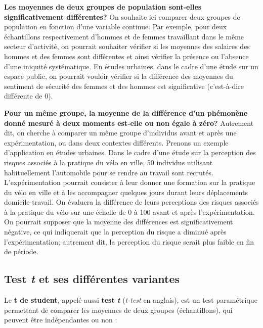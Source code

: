 \documentclass[
  11pt,
  french,
]{book}
\makeatletter
\newenvironment{kframev}{%
\medskip{}
\setlength{\fboxsep}{.8em}
 \def\at@end@of@kframev{}%
 \ifinner\ifhmode%
  \def\at@end@of@kframev{\end{minipage}}%
  \begin{minipage}{\columnwidth}%
 \fi\fi%
 \def\FrameCommand##1{\hskip\@totalleftmargin \hskip-\fboxsep
 \colorbox{shadebluecolor}{##1}\hskip-\fboxsep
     \hskip-\linewidth \hskip-\@totalleftmargin \hskip\columnwidth}%
 \MakeFramed {\advance\hsize-\width
   \@totalleftmargin\z@ \linewidth\hsize
   \@setminipage}}%
 {\par\unskip\endMakeFramed%
 \at@end@of@kframev}
\newenvironment{rmdblock}[1]
  {
  \begin{itemize}
  \renewcommand{\labelitemi}{
    \raisebox{-.7\height}[0pt][0pt]{
      {\setkeys{Gin}{width=3em,keepaspectratio}\texttt{[image: images/\#1]}}
    }
  }
  \setlength{\fboxsep}{1em}
  \begin{kframev}
  \small
  \item
  }
  {
  \end{kframev}
  \end{itemize}
  }
\newenvironment{bloc_objectif}
  {\begin{rmdblock}{objectif}}
  {\end{rmdblock}}
\makeatother
\begin{document}
\begin{bloc_objectif}

\textbf{Les moyennes de deux groupes de population sont-elles significativement différentes?} On souhaite ici comparer deux groupes de population en fonction d'une variable continue.
Par exemple, pour deux échantillons respectivement d'hommes et de femmes travaillant dans le même secteur d'activité, on pourrait souhaiter vérifier si les moyennes des salaires des hommes et des femmes sont différentes et ainsi vérifier la présence ou l'absence d'une iniquité systématique. En études urbaines, dans le cadre d'une étude sur un espace public, on pourrait vouloir vérifier si la différence des moyennes du sentiment de sécurité des femmes et des hommes est significative (c'est-à-dire différente de 0).

\textbf{Pour un même groupe, la moyenne de la différence d'un phémonène donné mesuré à deux moments est-elle ou non égale à zéro?} Autrement dit, on cherche à comparer un même groupe d'individus avant et après une expérimentation, ou dans deux contextes différents. Prenons un exemple d'application en études urbaines. Dans le cadre d'une étude sur la perception des risques associés à la pratique du vélo en ville, 50 individus utilisant habituellement l'automobile pour se rendre au travail sont recrutés. L'expérimentation pourrait consister à leur donner une formation sur la pratique du vélo en ville et à les accompagner quelques jours durant leurs déplacements domicile-travail. On évaluera la différence de leurs perceptions des risques associés à la pratique du vélo sur une échelle de 0 à 100 avant et après l'expérimentation. On pourrait supposer que la moyenne des différences est significativement négative, ce qui indiquerait que la perception du risque a diminué après l'expérimentation; autrement dit, la perception du risque serait plus faible en fin de période.

\end{bloc_objectif}

\hypertarget{sect0431}{%
\subsection{\texorpdfstring{Test \emph{t} et ses différentes variantes}{Test t et ses différentes variantes}}\label{sect0431}}

Le \textbf{t de student}, appelé aussi \textbf{test \emph{t}} (\emph{t-test} en anglais), est un test paramétrique permettant de comparer les moyennes de deux groupes (échantillons), qui peuvent être indépendantes ou non :
\end{document}
